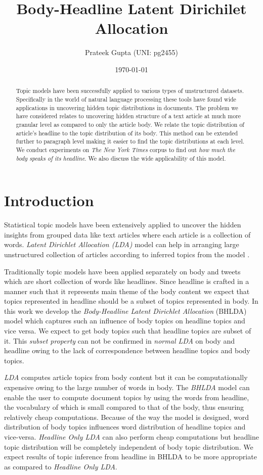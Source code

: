 \documentclass[a4paper]{article}
\title{Body-Headline Latent Dirichilet Allocation}
\author{Prateek Gupta (UNI: pg2455)}
\date{\today}
\begin{document}
\maketitle

\begin{abstract}
Topic models have been successfully applied to various types of unstructured datasets. Specifically in the world of natural language processing these tools have found wide applications in uncovering hidden topic distributions in documents. The problem we have considered relates to uncovering hidden structure of a text article at much more granular level as compared to only the article body. We relate the topic distribution of article's headline to the topic distribution of its body. This method can be extended further to paragraph level making it easier to find the topic distributions at each level. We conduct experiments on \textit{The New York Times} corpus to find out \textit{how much the body speaks of its headline}. We also discuss the wide applicability of this model.
\end{abstract}

\section{Introduction}
Statistical topic models have been extensively applied to uncover the hidden insights from grouped data like text articles where each article is a collection of words. \emph{Latent Dirichlet Allocation (LDA)} model can help in arranging large unstructured collection of articles according to inferred topics from the model \cite{blei_prob_model_paper}. 

Traditionally topic models have been applied separately on body\cite{blei_prob_model_paper, lda_blei} and tweets\cite{tm_lda} which are short collection of words like headlines. Since headline is crafted in a manner such that it represents main theme of the body content we expect that topics represented in headline should be a subset of topics represented in body. In this work we develop the \emph{Body-Headline Latent Dirichlet Allocation} (BHLDA) model which captures such an influence of body topics on headline topics and vice versa. We expect to get body topics such that headline topics are subset of it. This \emph{subset property} can not be confirmed in \emph{normal LDA} on body and headline owing to the lack of correspondence between headline topics and body topics.

\emph{LDA} computes article topics from body content but it can be computationally expensive owing to the large number of words in body. The \emph{BHLDA} model can enable the user to compute document topics by using the words from headline, the vocabulary of which is small compared to that of the body, thus ensuring relatively cheap computations. Because of the way the model is designed, word distribution of body topics influences word distribution of headline topics and vice-versa. \emph{Headline Only LDA} can also perform cheap computations but headline topic distribution will be completely independent of body topic distribution. We expect results of topic inference from headline in BHLDA to be more appropriate as compared to \emph{Headline Only LDA}.
\end{document}
